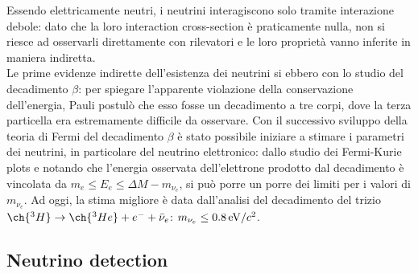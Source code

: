 Essendo elettricamente neutri, i neutrini interagiscono solo tramite interazione debole: dato che la loro interaction cross-section è praticamente nulla, non si riesce ad osservarli direttamente con rilevatori e le loro proprietà vanno inferite in maniera indiretta.\\
Le prime evidenze indirette dell'esistenza dei neutrini si ebbero con lo studio del decadimento $ \beta $: per spiegare l'apparente violazione della conservazione dell'energia, Pauli postulò che esso fosse un decadimento a tre corpi, dove la terza particella era estremamente difficile da osservare. Con il successivo sviluppo della teoria di Fermi del decadimento $ \beta $ è stato possibile iniziare a stimare i parametri dei neutrini, in particolare del neutrino elettronico: dallo studio dei Fermi-Kurie plots e notando che l'energia osservata dell'elettrone prodotto dal decadimento è vincolata da $ m_e \le E_e \le \Delta M - m_{\nu_e} $, si può porre un porre dei limiti per i valori di $ m_{\nu_e} $. Ad oggi, la stima migliore è data dall'analisi del decadimento del trizio $ \ch{^3H} \rightarrow \ch{^3He} + e^- + \bar{\nu}_e $: $ m_{\nu_e} \le 0.8\,\mathrm{eV}/c^2 $.

\subsection{Neutrino detection}

